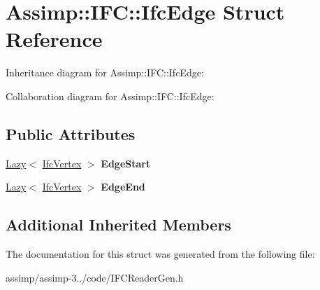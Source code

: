 \hypertarget{struct_assimp_1_1_i_f_c_1_1_ifc_edge}{\section{Assimp\+:\+:I\+F\+C\+:\+:Ifc\+Edge Struct Reference}
\label{struct_assimp_1_1_i_f_c_1_1_ifc_edge}
}


Inheritance diagram for Assimp\+:\+:I\+F\+C\+:\+:Ifc\+Edge\+:


Collaboration diagram for Assimp\+:\+:I\+F\+C\+:\+:Ifc\+Edge\+:
\subsection*{Public Attributes}
\begin{DoxyCompactItemize}
\item 
\hypertarget{struct_assimp_1_1_i_f_c_1_1_ifc_edge_a62e565b271b4896e14b214bfaa30d285}{\hyperlink{struct_assimp_1_1_s_t_e_p_1_1_lazy}{Lazy}$<$ \hyperlink{struct_assimp_1_1_i_f_c_1_1_ifc_vertex}{Ifc\+Vertex} $>$ {\bfseries Edge\+Start}}\label{struct_assimp_1_1_i_f_c_1_1_ifc_edge_a62e565b271b4896e14b214bfaa30d285}

\item 
\hypertarget{struct_assimp_1_1_i_f_c_1_1_ifc_edge_a181dc65ed0da12f32717a58d51d616ea}{\hyperlink{struct_assimp_1_1_s_t_e_p_1_1_lazy}{Lazy}$<$ \hyperlink{struct_assimp_1_1_i_f_c_1_1_ifc_vertex}{Ifc\+Vertex} $>$ {\bfseries Edge\+End}}\label{struct_assimp_1_1_i_f_c_1_1_ifc_edge_a181dc65ed0da12f32717a58d51d616ea}

\end{DoxyCompactItemize}
\subsection*{Additional Inherited Members}


The documentation for this struct was generated from the following file\+:\begin{DoxyCompactItemize}
\item 
assimp/assimp-\/3../code/I\+F\+C\+Reader\+Gen.\+h\end{DoxyCompactItemize}
